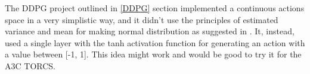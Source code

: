 The DDPG project outlined in \ref{DDPG} section implemented a continuous actions space in a very simplistic way, and it didn't use the principles of estimated variance and mean for making normal distribution as suggested in \cite{Sutton}. It, instead, used a single layer with the tanh activation function for generating an action with a value between [-1, 1]. This idea might work and would be good to try it for the A3C TORCS.